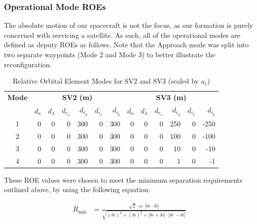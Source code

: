\subsubsection{Operational Mode ROEs}
The absolute motion of our spacecraft is not the focus, as our formation is purely concerned with servicing a satellite. As such, all of the operational modes are defined as deputy ROEs as follows. Note that the Approach mode was split into two separate waypoints (Mode 2 and Mode 3) to better illustrate the reconfiguration. 

\begin{table}[h!]
\centering
\begin{tabular}{|c|rrrrrr|rrrrrr|}
\hline
\textbf{Mode} & \multicolumn{6}{c|}{\textbf{SV2 (m)}} & \multicolumn{6}{c|}{\textbf{SV3 (m)}} \\
\cline{2-13}
 & $d_a$ & $d_\lambda$ & $d_{e_x}$ & $d_{e_y}$ & $d_{i_x}$ & $d_{i_y}$ 
 & $d_a$ & $d_\lambda$ & $d_{e_x}$ & $d_{e_y}$ & $d_{i_x}$ & $d_{i_y}$ \\
\hline
1 & 0 & 0 & 0 & 300 & 0 & 300 & 0 & 0 & 0 & 250 & 0 & -250 \\
2 & 0 & 0 & 0 & 300 & 0 & 300 & 0 & 0 & 0 & 100 & 0 & -100 \\
3 & 0 & 0 & 0 & 300 & 0 & 300 & 0 & 0 & 0 & 10  & 0 & -10 \\
4 & 0 & 0 & 0 & 300 & 0 & 300 & 0 & 0 & 0 & 1   & 0 & -1 \\
\hline
\end{tabular}
\caption{Relative Orbital Element Modes for SV2 and SV3 (scaled by $a_c$)}
\label{tab:roe_modes}
\end{table}

These ROE values were chosen to meet the minimum separation requirements outlined above, by using the following equation:

\begin{align}
R_{\min} &= \frac{\sqrt{2} \cdot a \cdot |\delta e \cdot \delta i|}%
{\sqrt{(\delta e)^2 + (\delta i)^2 + |\delta e + \delta i| \cdot |\delta e - \delta i|}}
\end{align} \label{eqn:roe_spacing}

